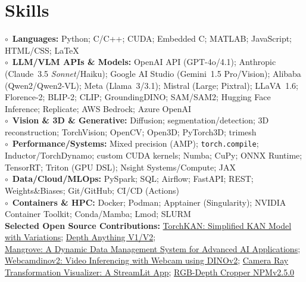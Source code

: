 \section*{Skills}

$\circ$~\textbf{Languages:} Python; C/C++; CUDA; Embedded C; MATLAB; JavaScript; HTML/CSS; \LaTeX\\
$\circ$~\textbf{LLM/VLM APIs \& Models:} OpenAI API (GPT\mbox{-}4o/4.1); Anthropic (Claude~3.5 \emph{Sonnet}/Haiku); Google AI Studio (Gemini~1.5 Pro/Vision); Alibaba (Qwen2/Qwen2\mbox{-}VL); Meta (Llama~3/3.1); Mistral (Large; Pixtral); LLaVA~1.6; Florence\mbox{-}2; BLIP\mbox{-}2; CLIP; GroundingDINO; SAM/SAM2; Hugging Face Inference; Replicate; AWS Bedrock; Azure OpenAI\\
$\circ$~\textbf{Vision \& 3D \& Generative:} Diffusion; segmentation/detection; 3D reconstruction; TorchVision; OpenCV; Open3D; PyTorch3D; trimesh\\
$\circ$~\textbf{Performance/Systems:} Mixed precision (AMP); \texttt{torch.compile}; Inductor/TorchDynamo; custom CUDA kernels; Numba; CuPy; ONNX Runtime; TensorRT; Triton (GPU DSL); Nsight Systems/Compute; JAX\\
$\circ$~\textbf{Data/Cloud/MLOps:} PySpark; SQL; Airflow; FastAPI; REST; Weights\&Biases; Git/GitHub; CI/CD (Actions)\\
$\circ$~\textbf{Containers \& HPC:} Docker; Podman; Apptainer (Singularity); NVIDIA Container Toolkit; Conda/Mamba; Lmod; SLURM\\

\textbf{Selected Open Source Contributions:} 
\href{https://github.com/1ssb/torchkan}{TorchKAN: Simplified KAN Model with Variations};
\href{https://github.com/LiheYoung/Depth-Anything}{Depth Anything V1/V2};  \\
\href{https://github.com/1ssb/mangroves}{Mangrove: A Dynamic Data Management System for Advanced AI Applications};
\href{https://github.com/1ssb/webcamdino}{Webcamdinov2: Video Inferencing with Webcam using DINOv2};
\href{https://github.com/1ssb/ray_visualizer}{Camera Ray Transformation Visualizer: A StreamLit App};
\href{https://github.com/1ssb/RGBD_cropper_tool}{RGB-Depth Cropper NPMv2.5.0}
